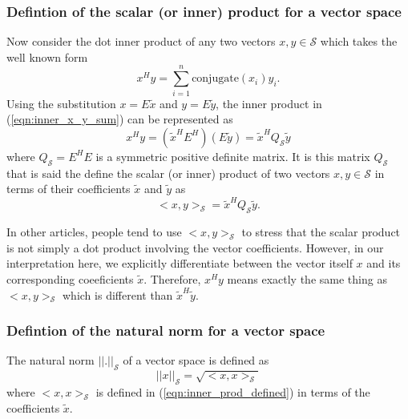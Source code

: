 \subsubsection{Defintion of the scalar (or inner) product for a vector space}

Now consider the dot inner product of any two vectors $x,y\in\mathcal{S}$
which takes the well known form
%
\begin{equation}
x^H y = \sum_{i=1}^n \mbox{conjugate}(x_i) y_i.
\label{eqn:inner_x_y_sum}
\end{equation}
%
Using the substitution $x = E {}\tilde{x}$ and $y = E {}\tilde{y}$, the inner
product in (\ref{eqn:inner_x_y_sum}) can be represented as
%
\begin{equation}
x^H y = ( \tilde{x}^H E^H ) ( E \tilde{y} ) = \tilde{x}^H Q_{\mathcal{S}} \tilde{y}
\label{eqn:inner_x_y_E_prod}
\end{equation}
%
where $Q_{\mathcal{S}} = E^H E$ is a symmetric positive definite matrix.  It
is this matrix $Q_{\mathcal{S}}$ that is said the define the scalar (or inner)
product of two vectors $x,y\in\mathcal{S}$ in terms of their coefficients
$\tilde{x}$ and $\tilde{y}$ as
%
\begin{equation}
<x,y>_{\mathcal{S}} = \tilde{x}^H Q_{\mathcal{S}} \tilde{y}.
\label{eqn:inner_prod_defined}
\end{equation}
%

In other articles, people tend to use $<x,y>_{\mathcal{S}}$ to stress that the
scalar product is not simply a dot product involving the vector coefficients.
However, in our interpretation here, we explicitly differentiate between the
vector itself $x$ and its corresponding coeeficients $\tilde{x}$.  Therefore,
$x^H y$ means exactly the same thing as $<x,y>_{\mathcal{S}}$ which is
different than $\tilde{x}^H {}\tilde{y}$.

\subsubsection{Defintion of the natural norm for a vector space}

The natural norm $||.||_{\mathcal{S}}$ of a vector space is defined as
%
\begin{equation}
||x||_{\mathcal{S}} = \sqrt{<x,x>_{\mathcal{S}}}
\label{eqn:natural_norm_defined}
\end{equation}
%
where $<x,x>_{\mathcal{S}}$ is defined in (\ref{eqn:inner_prod_defined}) in
terms of the coefficients $\tilde{x}$.


